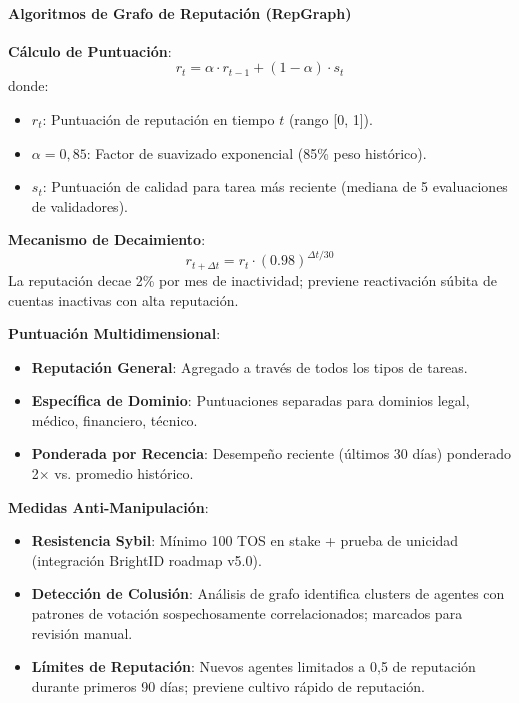\documentclass[11pt]{article}
\begin{document}
\paragraph{Algoritmos de Grafo de Reputación (RepGraph)}

\textbf{Cálculo de Puntuación}:
\begin{equation}
r_t = \alpha \cdot r_{t-1} + (1 - \alpha) \cdot s_t
\end{equation}
donde:
\begin{itemize}[noitemsep]
  \item $r_t$: Puntuación de reputación en tiempo $t$ (rango [0, 1]).
  \item $\alpha = 0,85$: Factor de suavizado exponencial (85\% peso histórico).
  \item $s_t$: Puntuación de calidad para tarea más reciente (mediana de 5 evaluaciones de validadores).
\end{itemize}

\textbf{Mecanismo de Decaimiento}:
\begin{equation}
r_{t+\Delta t} = r_t \cdot (0.98)^{\Delta t / 30}
\end{equation}
La reputación decae 2\% por mes de inactividad; previene reactivación súbita de cuentas inactivas con alta reputación.

\textbf{Puntuación Multidimensional}:
\begin{itemize}[noitemsep]
  \item \textbf{Reputación General}: Agregado a través de todos los tipos de tareas.
  \item \textbf{Específica de Dominio}: Puntuaciones separadas para dominios legal, médico, financiero, técnico.
  \item \textbf{Ponderada por Recencia}: Desempeño reciente (últimos 30 días) ponderado 2$\times$ vs. promedio histórico.
\end{itemize}

\textbf{Medidas Anti-Manipulación}:
\begin{itemize}[noitemsep]
  \item \textbf{Resistencia Sybil}: Mínimo 100 TOS en stake + prueba de unicidad (integración BrightID roadmap v5.0).
  \item \textbf{Detección de Colusión}: Análisis de grafo identifica clusters de agentes con patrones de votación sospechosamente correlacionados; marcados para revisión manual.
  \item \textbf{Límites de Reputación}: Nuevos agentes limitados a 0,5 de reputación durante primeros 90 días; previene cultivo rápido de reputación.
\end{itemize}
\end{document}

